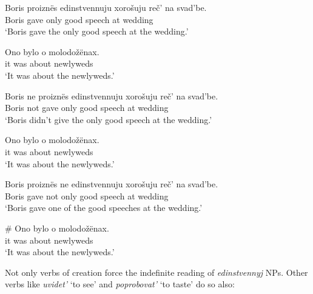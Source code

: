 \begin{exe}
	\ex \begin{xlist}
		\ex \gll Boris proizn\"{e}s edinstvennuju xoro\v{s}uju re\v{c}' na svad'be.\\
		Boris gave only good speech at wedding\\
		\glt `Boris gave the only good speech at the wedding.'

		\ex \gll Ono bylo o molodo\v{z}\"{e}nax.\\
		it was about newlyweds\\
		\glt `It was about the newlyweds.'
	\end{xlist}

	\ex \begin{xlist}
		\ex \gll Boris ne proizn\"{e}s edinstvennuju xoro\v{s}uju re\v{c}' na svad'be.\\
		Boris not gave only good speech at wedding\\
		\glt `Boris didn't give the only good speech at the wedding.'

		\ex \gll Ono bylo o molodo\v{z}\"{e}nax.\\
		it was about newlyweds\\
		\glt `It was about the newlyweds.'
	\end{xlist}

	\ex \label{boris3} \begin{xlist}
		\ex \gll Boris proizn\"{e}s ne edinstvennuju xoro\v{s}uju re\v{c}' na svad'be.\\
		Boris gave not only good speech at wedding\\
		\glt `Boris gave one of the good speeches at the wedding.'

		\ex \gll \# Ono bylo o molodo\v{z}\"{e}nax.\\
		{} it was about newlyweds\\
		\glt `It was about the newlyweds.'
	\end{xlist}
\end{exe}

Not only verbs of creation force the indefinite reading of \textit{edinstvennyj} NPs. Other verbs like \textit{uvidet'} `to see' and \textit{poprobovat'} `to taste' do so also:

